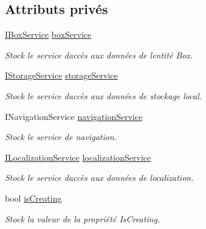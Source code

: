 \subsection*{Attributs privés}
\begin{DoxyCompactItemize}
\item 
\hyperlink{interface_boxes_1_1_services_1_1_box_1_1_i_box_service}{I\+Box\+Service} \hyperlink{class_boxes_1_1_view_models_1_1_create_box_view_model_a8be21e46beb28538d8b26af0d44f38f8}{box\+Service}
\begin{DoxyCompactList}\small\item\em Stock le service d\textquotesingle{}accès aux données de l\textquotesingle{}entité Box. \end{DoxyCompactList}\item 
\hyperlink{interface_boxes_1_1_services_1_1_storage_1_1_i_storage_service}{I\+Storage\+Service} \hyperlink{class_boxes_1_1_view_models_1_1_create_box_view_model_a2aaf62134a95ddf88ddc76c25034507e}{storage\+Service}
\begin{DoxyCompactList}\small\item\em Stock le service d\textquotesingle{}accès aux données de stockage local. \end{DoxyCompactList}\item 
I\+Navigation\+Service \hyperlink{class_boxes_1_1_view_models_1_1_create_box_view_model_a221f3343f2eb1a4016c0e70705b75245}{navigation\+Service}
\begin{DoxyCompactList}\small\item\em Stock le service de navigation. \end{DoxyCompactList}\item 
\hyperlink{interface_boxes_1_1_services_1_1_localization_1_1_i_localization_service}{I\+Localization\+Service} \hyperlink{class_boxes_1_1_view_models_1_1_create_box_view_model_a050aeaedf44bac7ae4299524e5c96657}{localization\+Service}
\begin{DoxyCompactList}\small\item\em Stock le service d\textquotesingle{}accès aux données de localization. \end{DoxyCompactList}\item 
bool \hyperlink{class_boxes_1_1_view_models_1_1_create_box_view_model_ad4145991b27c3fcddb5e8142f016fddd}{is\+Creating}
\begin{DoxyCompactList}\small\item\em Stock la valeur de la propriété {\ttfamily Is\+Creating}. \end{DoxyCompactList}\item 

\end{DoxyCompactItemize}
